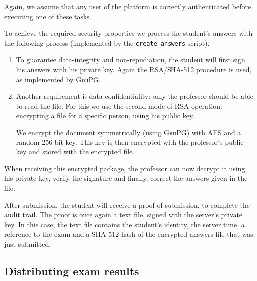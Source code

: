 \documentclass[12pt]{article}
\begin{document}

Again, we assume that any user of the platform is correctly authenticated before
executing one of these tasks.

To achieve the required security properties we process the student's answers with
the following process (implemented by the \texttt{create-answers} script).

\begin{enumerate}

\item To guarantee data-integrity and non-repudiation, the student will first
sign his answers with his private key. Again the RSA/SHA-512 procedure is used,
as implemented by GnuPG.

\item Another requirement is data confidentiality: only the professor should be
able to read the file. For this we use the second mode of RSA-operation:
encrypting a file for a specific person, using his public key.

We encrypt the document symmetrically (using GnuPG) with AES and a random 256
bit key. This key is then encrypted with the professor's public
key\footnotemark{} and stored with the encrypted file.


\end{enumerate}

When receiving this encrypted package, the professor can now decrypt it using
his private key, verify the signature and finally, correct the answers given in
the file.

After submission, the student will receive a proof of submission, to complete
the audit trail. The proof is once again a text file, signed with the server's
private key.  In this case, the text file contains the student's identity, the
server time, a reference to the exam and a SHA-512 hash of the encrypted answers
file that was just submitted.

\subsection{Distributing exam results}
\label{subsec:impl-results}
\end{document}
